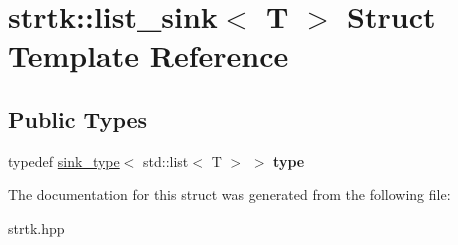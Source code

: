 \hypertarget{structstrtk_1_1list__sink}{\section{strtk\-:\-:list\-\_\-sink$<$ T $>$ Struct Template Reference}
\label{structstrtk_1_1list__sink}
}
\subsection*{Public Types}
\begin{DoxyCompactItemize}
\item 
\hypertarget{structstrtk_1_1list__sink_a081a9e06b229d6c7bf4268c4efbb2611}{typedef \hyperlink{classstrtk_1_1sink__type}{sink\-\_\-type}$<$ std\-::list$<$ T $>$ $>$ {\bfseries type}}\label{structstrtk_1_1list__sink_a081a9e06b229d6c7bf4268c4efbb2611}

\end{DoxyCompactItemize}


The documentation for this struct was generated from the following file\-:\begin{DoxyCompactItemize}
\item 
strtk.\-hpp\end{DoxyCompactItemize}
